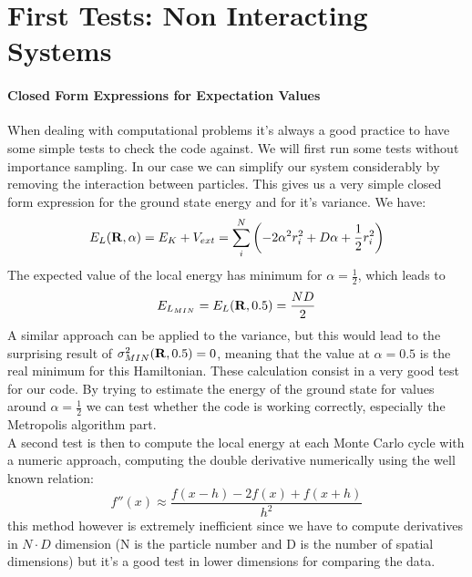 \documentclass[10pt,a4paper,titlepage]{article}
\begin{document}
\section*{First Tests: Non Interacting Systems}
\paragraph*{Closed Form Expressions for Expectation Values}When dealing with computational problems it's always a good practice to have some simple tests to check the code against. We will first run some tests without importance sampling. In our case we can simplify our system considerably by removing the interaction between particles. This gives us a very simple closed form expression for the ground state energy and for it's variance. We have:
\[
   E_{L}({\bf R},\alpha)=E_{K} + V_{ext} = \sum_i^N \left( -2 \alpha^2 r_i^2 + D \alpha + \frac{1}{2}r_i^2 \right)
   \label{eq:locale2}
\]
The expected value of the local energy has minimum for $\alpha =  \frac{1}{2}$, which leads to 
\[
   E_{L_{MIN}}=E_{L}({\bf R},0.5)=\frac{N D}{2}
   \label{eq:locale2}
\]
A similar approach can be applied to the variance, but this would lead to the surprising result of $\sigma ^2_{MIN} ({\bf R},0.5) = 0$, meaning that the value at $\alpha = 0.5$ is the real minimum for this Hamiltonian. These calculation consist in a very good test for our code. By trying to estimate the energy of the ground state for values around $\alpha =  \frac{1}{2}$ we can test whether the code is working correctly, especially the Metropolis algorithm part. \\
A second test is then to compute the local energy at each Monte Carlo cycle with a numeric approach, computing the double derivative numerically using the well known relation:
\[
f''(x) \approx \frac{f(x-h)-2f(x)+f(x+h)}{h^2}
\]
this method however is extremely inefficient since we have to compute derivatives in $N\cdot D$ dimension (N is the particle number and D is the number of spatial dimensions) but it's a good test in lower dimensions for comparing the data.
\end{document}

